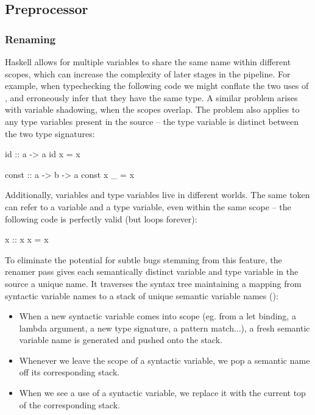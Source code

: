 \documentclass[dissertation.tex]{subfiles}
\begin{document}
{{    }
    \subsection{Preprocessor}
    {
        \subsubsection{Renaming}
        {

            Haskell allows for multiple variables to share the same name within different scopes, which can increase the
            complexity of later stages in the pipeline. For example, when typechecking the following code we might
            conflate the two uses of , and erroneously infer that they have the same type. A similar problem
            arises with variable shadowing, when the scopes overlap. The problem also applies to any type variables
            present in the source -- the type variable  is distinct between the two type signatures:

            \begin{haskellfigure}
            id :: a -> a
            id x = x

            const :: a -> b -> a
            const x _ = x
            \end{haskellfigure}

            Additionally, variables and type variables live in different worlds. The same token can refer to a variable
            and a type variable, even within the same scope -- the following code is perfectly valid (but loops
            forever):

            \begin{haskellfigure}
            x :: x
            x = x
            \end{haskellfigure}

            To eliminate the potential for subtle bugs stemming from this feature, the renamer pass gives each
            semantically distinct variable and type variable in the source a unique name. It traverses the syntax tree
            maintaining a mapping from syntactic variable names to a stack of unique semantic variable names
            ():

            \begin{itemize}
            \item When a new syntactic variable comes into scope (eg. from a let binding, a lambda argument, a new type signature, a pattern match...), a fresh semantic variable name is generated and pushed onto the stack.
            \item Whenever we leave the scope of a syntactic variable, we pop a semantic name off its corresponding
            stack.
            \item When we see a use of a syntactic variable, we replace it with the current top of the corresponding
            stack.
            \end{itemize}

}}}
\end{document}
